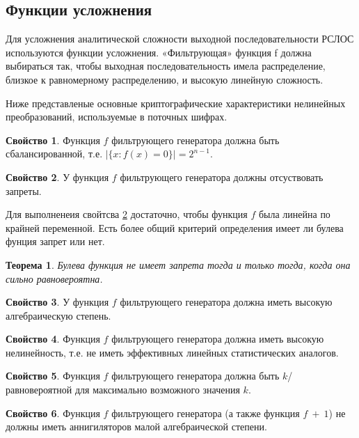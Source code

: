 \documentclass[a4paper,12pt]{article}
\newtheorem{theorem}{Теорема}[section]
\theoremstyle{definition}
\newtheorem{property}{Свойство}[subsection]
\begin{document}
	\subsection{Функции усложнения} \label{Функции усложнения}
	
	Для усложнения аналитической сложности выходной	последовательности РСЛОС используются функции усложнения. «Фильтрующая» функция f должна выбираться так, чтобы выходная последовательность имела распределение, близкое к равномерному распределению, и высокую линейную сложность.

	
	Ниже представленые основные криптографические характеристики нелинейных преобразований, используемые в поточных шифрах.
	
	
	\begin{property}
		Функция $f$ фильтрующего генератора должна быть сбалансированной, т.е.  $|\{x : f(x) = 0\}| = 2^{n-1} $.  
	\end{property}

	\begin{property} \label{prop::zapr}
		У функция $f$ фильтрующего генератора должны отсуствовать запреты. 
	\end{property}

	Для выполненеия свойтсва \ref{prop::zapr} достаточно, чтобы функция $f$ была линейна по крайней переменной. Есть более общий критерий определения имеет ли булева фунция запрет или нет.
	
	\begin{theorem}
		Булева функция не имеет запрета тогда и только тогда, когда она сильно равновероятна.

	\end{theorem}

	\begin{property} 
		У функция $f$ фильтрующего генератора должна иметь высокую алгебраическую степень.
	\end{property}

	\begin{property} 
		Функция $f$ фильтрующего генератора должна иметь высокую нелинейность, т.е. не иметь эффективных линейных статистических аналогов.
	\end{property}

	\begin{property} 
		Функция $f$ фильтрующего генератора должна быть $k$\-/равновероятной для максимально возможного значения $k$.
	\end{property}
	
	\begin{property} 
		Функция $f$ фильтрующего генератора (а также функция $f~+~1$) не должны иметь аннигиляторов малой алгебраической степени.
	\end{property}
	
\end{document}
